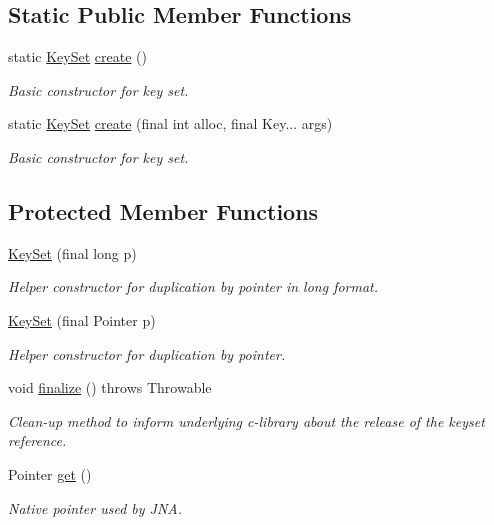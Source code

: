 \subsection*{Static Public Member Functions}
\begin{DoxyCompactItemize}
\item 
static \hyperlink{classorg_1_1libelektra_1_1KeySet}{Key\+Set} \hyperlink{classorg_1_1libelektra_1_1KeySet_ac0ba4b88bef5e731b586f4ca63b9ab7f}{create} ()
\begin{DoxyCompactList}\small\item\em Basic constructor for key set. \end{DoxyCompactList}\item 
static \hyperlink{classorg_1_1libelektra_1_1KeySet}{Key\+Set} \hyperlink{classorg_1_1libelektra_1_1KeySet_a441d0e45a150a6fd5f75be00ec42338d}{create} (final int alloc, final Key... args)
\begin{DoxyCompactList}\small\item\em Basic constructor for key set. \end{DoxyCompactList}\end{DoxyCompactItemize}
\subsection*{Protected Member Functions}
\begin{DoxyCompactItemize}
\item 
\hyperlink{classorg_1_1libelektra_1_1KeySet_a72507fbeb96bfb90e44562e0a8e70331}{Key\+Set} (final long p)
\begin{DoxyCompactList}\small\item\em Helper constructor for duplication by pointer in long format. \end{DoxyCompactList}\item 
\hyperlink{classorg_1_1libelektra_1_1KeySet_adf4ea02b31ed468e49c615f61ea57a15}{Key\+Set} (final Pointer p)
\begin{DoxyCompactList}\small\item\em Helper constructor for duplication by pointer. \end{DoxyCompactList}\item 
\mbox{\label{classorg_1_1libelektra_1_1KeySet_ad11eed8c4aeea5b9af381e0185b3a097}} 
void \hyperlink{classorg_1_1libelektra_1_1KeySet_ad11eed8c4aeea5b9af381e0185b3a097}{finalize} ()  throws Throwable 
\begin{DoxyCompactList}\small\item\em Clean-\/up method to inform underlying c-\/library about the release of the keyset reference. \end{DoxyCompactList}\item 
Pointer \hyperlink{classorg_1_1libelektra_1_1KeySet_abf3f028c9c3b88a47aa9d67a5c8e95da}{get} ()
\begin{DoxyCompactList}\small\item\em Native pointer used by J\+NA. \end{DoxyCompactList}\end{DoxyCompactItemize}
